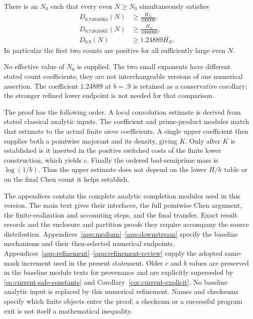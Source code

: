 \begin{corollary}
\label{cor:current-explicit}
There is an $N_0$ such that every even $N\ge N_0$ simultaneously satisfies
\begin{align}
 D_{0.74816964}(N)&\ge \frac{H_N}{100000},
                         \label{eq:current-main-count}\\
 D_{0.74816865}(N)&\ge \frac{H_N}{1000000},
                         \label{eq:current-secondary-count}\\
 D_{0.9}(N)&\ge 1.24889H_N.  \label{eq:current-common-exponent}
\end{align}
In particular the first two counts are positive for all sufficiently
large even $N$.
\end{corollary}

No effective value of $N_0$ is supplied.  The two small exponents have
different stated count coefficients; they are not interchangeable
versions of one numerical assertion.  The coefficient $1.24889$ at
$b=.9$ is retained as a conservative corollary; the stronger refined
lower endpoint is not needed for that comparison.

The proof has the following order.  A local convolution estimate is
derived from stated classical analytic inputs.  The coefficient and
prime-product modules match that estimate to the actual finite sieve
coefficients.  A single upper coefficient then supplies both a pointwise
majorant and its density, giving $K$.  Only after $K$ is established is it
inserted in the positive switched costs of the finite lower construction,
which yields $c$.  Finally the ordered bad-semiprime mass is
$\log(1/b)$.  Thus the upper estimate does not depend on the lower
$H/h$ table or on the final Chen count it helps establish.

The appendices contain the complete analytic completion modules used
in this version.  The main text gives their interfaces, the full
pointwise Chen argument, the finite-realization and accounting steps,
and the final transfer.  Exact result records and the enclosure and
partition proofs they require accompany the source distribution.
Appendices~\ref{app:medium}--\ref{app:downstream} specify the
baseline mechanisms and their then-selected numerical endpoints.
Appendices~\ref{app:refinement}--\ref{app:refinement-review}
supply the adopted same-mask increment used in the present statement.
Older $c$ and $b$ values are preserved in the baseline module texts
for provenance and are explicitly superseded by
\eqref{eq:current-safe-constants} and
Corollary~\ref{cor:current-explicit}.  No baseline analytic input is
replaced by this numerical refinement.
Names and checksums specify which finite objects enter the proof; a
checksum or a successful program exit is not itself a mathematical
inequality.

